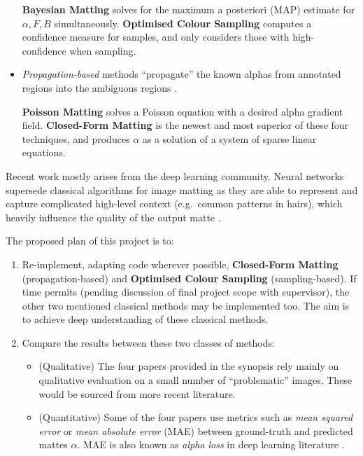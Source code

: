 \documentclass{article}
\begin{document}
\begin{multicols}{2}[]
\begin{itemize}
    \textbf{Bayesian Matting} \cite{bayesian-matting} solves for the maximum a posteriori (MAP) estimate for $\alpha,F,B$ simultaneously. \textbf{Optimised Colour Sampling} \cite{robust-matting} computes a confidence measure for samples, and only considers those with high-confidence when sampling.
    \item \emph{Propagation-based} methods ``propagate'' the known alphas from annotated regions into the ambiguous regions \cite{dim-paper}.

    \textbf{Poisson Matting} \cite{poisson-matting} solves a Poisson equation with a desired alpha gradient field. \textbf{Closed-Form Matting} \cite{closed-form-matting} is the newest and most superior of these four techniques, and produces $\alpha$ as a solution of a system of sparse linear equations.
\end{itemize}

Recent work mostly arises from the deep learning community. Neural networks supersede classical algorithms for image matting as they are able to  represent and capture complicated high-level context (e.g.\ common patterns in hairs), which heavily influence the quality of the output matte \cite{sota-composition-1k}.



The proposed plan of this project is to:
\begin{enumerate}[label=\arabic*.]
    \item Re-implement, adapting code wherever possible, \textbf{Closed-Form Matting} (propagation-based) and \textbf{Optimised Colour Sampling} (sampling-based). If time permits (pending discussion of final project scope with supervisor), the other two mentioned classical methods may be implemented too. The aim is to achieve deep understanding of these classical methods.
    \item Compare the results between these two classes of methods:
    \begin{itemize}
        \item (Qualitative) The four papers provided in the synopsis \cite{bayesian-matting, robust-matting, poisson-matting, closed-form-matting} rely mainly on qualitative evaluation on a small number of ``problematic'' images. These would be sourced from more recent literature.
        \item (Quantitative) Some of the four papers use metrics such as \emph{mean squared error} or \emph{mean absolute error} (MAE) between ground-truth and predicted mattes $\alpha$. MAE is also known as \emph{alpha loss} in deep learning literature \cite{dnn-survey}.


\end{itemize}
\end{enumerate}
\end{multicols}
\end{document}
